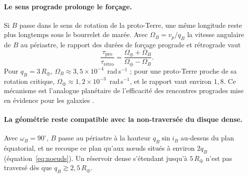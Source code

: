 \documentclass[11pt,a4paper,openany]{report}
\newcommand{\Rt}{R_{\oplus}}
\begin{document}
\paragraph{Le sens prograde prolonge le forçage.}
Si $B$ passe dans le sens de rotation de la proto-Terre, une même longitude reste plus longtemps
sous le bourrelet de marée. Avec $\Omega_B=v_p/q_B$ la vitesse angulaire de $B$ au périastre, le
rapport des durées de forçage prograde et rétrograde vaut
\begin{equation}
\frac{\tau_{\mathrm{pro}}}{\tau_{\text{rétro}}}=\frac{\Omega_\oplus+\Omega_B}{\Omega_\oplus-\Omega_B}.
\label{eq:prograde}
\end{equation}
Pour $q_B=3\,\Rt$, $\Omega_B\approx3{,}5\times10^{-4}$~rad\,s$^{-1}$ ; pour une proto-Terre proche de
sa rotation critique, $\Omega_\oplus\approx1{,}2\times10^{-3}$~rad\,s$^{-1}$, et le rapport vaut
environ $1{,}8$. Ce mécanisme est l'analogue planétaire de l'efficacité des rencontres progrades
mise en évidence pour les galaxies \cite{ToomreToomre1972}.

\paragraph{La géométrie reste compatible avec la non-traversée du disque dense.}
Avec $\omega_B=90^\circ$, $B$ passe au périastre à la hauteur $q_B\sin i_B$ au-dessus du plan
équatorial, et ne recoupe ce plan qu'aux nœuds situés à environ $2q_B$
(équation~\eqref{eq:noeuds}). Un réservoir dense s'étendant jusqu'à $5\,\Rt$ n'est pas traversé dès
que $q_B\gtrsim2{,}5\,\Rt$.
\end{document}
